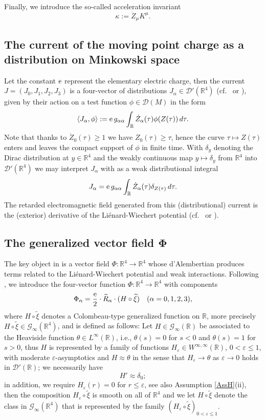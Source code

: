 \documentclass[sumlimits,intlimits,namelimits%
]{amsart}
\newcommand{\D}{\ensuremath{\mathcal{D}}}
\newcommand{\G}{\ensuremath{\mathcal{G}}}
\newcommand{\mb}[1]{\ensuremath{\mathbb{#1}}}
\newcommand{\R}{\mb{R}}
\theoremstyle{definition}
\newcommand{\beq}{\begin{equation}}
\newcommand{\eeq}{\end{equation}}
\newcommand{\col}{\colon}
\newcommand{\dis}[2]{\langle #1 , #2 \rangle}
\newcommand{\al}{\alpha}
\newcommand{\de}{\delta}
\newcommand{\eps}{\varepsilon}
\newcommand{\e}{\textup{e}}
\begin{document}
Finally, we introduce the so-called acceleration invariant
\beq\label{KZKappa} 
\kappa:=\ddot{Z}_\mu K^\mu.
\eeq

\subsection{The current of the moving point charge as a distribution on Minkowski space}\label{JDis}
Let the constant $\e$ represent the elementary electric charge, then the current $J = (J_0, J_1, J_2, J_3)$ is a four-vector of distributions $J_\al \in \D'(\R^4)$ (cf.\ \cite[Section 4.1]{Parrott} or \cite[Remark (7.3.25), 2]{Thirring:01}), given by their action on a test function $\phi \in \D(M)$ in the form
$$
    \dis{J_\al}{\phi} := \e \, g_{\al \al} \int_\R \dot{Z}_\al(\tau) \phi(Z(\tau)) \, d \tau.
$$ 
Note that thanks to $\dot{Z}_0(\tau) \geq 1$ we have $Z_0(\tau) \geq \tau$, hence the curve $\tau \mapsto Z(\tau)$ enters and leaves the compact support of $\phi$ in finite time. With $\de_y$ denoting the Dirac distribution at $y \in \R^4$ and the weakly continuous map $y \mapsto \de_y$ from $\R^4$ into  $\D'(\R^4)$ we may interpret $J_\al$ with as a weak distributional integral
$$
    J_\al = \e \, g_{\al \al} \int_\R \dot{Z}_\al(\tau) \de_{Z(\tau)} \, d\tau.
$$
The retarded electromagnetic field generated from this (distributional) current is the (exterior) derivative of the Li\'enard-Wiechert potential
 (cf.\ \cite[Sections 8.2 and 8.3]{Thirring:01} or \cite[Section 4.2]{Parrott}). 

\subsection{The generalized vector field $\bm{\Phi}$} 
The key object in \cite{GEW} is a vector field $\Phi \col \R^4 \to \R^4$ whose d'Alembertian produces terms related to the Li\'enard-Wiechert potential and weak interactions. Following \cite[Equation (4.1)]{GEW}, we introduce the four-vector function $\Phi \col \R^4 \to \R^4$ with components
\beq\label{Phi}
\Phi_\alpha=\frac{\e}{2}\cdot \widetilde{R}_\al \cdot (H \circ \widetilde{\xi}) \quad (\alpha = 0,1, 2, 3),
\eeq
where $H \circ \widetilde{\xi}$ denotes a Colombeau-type generalized function on $\R$, more precisely $H \circ \widetilde{\xi} \in  \G_\infty(\R^4)$, and is defined as follows: Let $H \in \G_\infty(\R)$ be associated to the Heaviside function $\theta \in L^\infty(\R)$, i.e., $\theta(s) = 0$ for $s < 0$ and $\theta(s) = 1$ for $s > 0$, thus $H$ is represented by a family of functions $H_\eps \in W^{\infty,\infty}(\R)$, $0 < \eps \leq 1$, with moderate $\eps$-asymptotics and $H \approx \theta$ in the sense that $H_\eps \to \theta$ as $\eps \to 0$ holds in $\D'(\R)$; we necessarily have 
\beq \label{HD}
H' \approx \de_0;
\eeq
in addition, we require $H_\eps(r) = 0$ for $r \leq \eps$, see also Assumption \ref{AssH}(ii), then the composition $H_\eps \circ \widetilde{\xi}$ is smooth on all of $\R^4$ and we let $H \circ \widetilde{\xi}$ denote the class in $\G_\infty(\R^4)$ that is represented by the family $(H_\eps \circ \widetilde{\xi})_{0 < \eps \leq 1}$.
\end{document}
